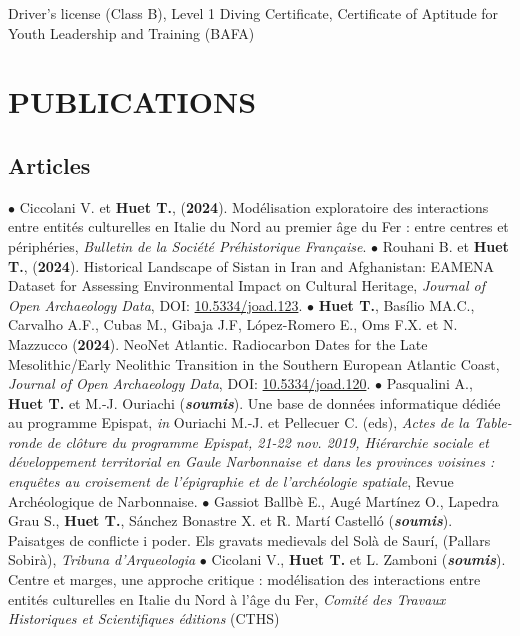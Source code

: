 \documentclass{article}
\newcommand{\fr}[1]{} %
\newcommand{\en}[1]{#1}   %
\begin{document}
{{Driver's license (Class B), Level 1 Diving Certificate, Certificate of Aptitude for Youth Leadership and Training (BAFA)}


\section{PUBLICATIONS}

\subsection*{\fr{Articles}\en{Articles}}
$\bullet$ Ciccolani V. et \textbf{Huet T.}, (\textbf{2024}). Modélisation exploratoire des interactions entre entités culturelles en Italie du Nord au premier âge du Fer : entre centres et périphéries, \textit{Bulletin de la Soci\'{e}t\'{e} Pr\'{e}historique Fran\c{c}aise}.
\smallbreak
$\bullet$ Rouhani B. et \textbf{Huet T.}, (\textbf{2024}). Historical Landscape of Sistan in Iran and Afghanistan: EAMENA Dataset for Assessing Environmental Impact on Cultural Heritage, \textit{Journal of Open Archaeology Data}, DOI: \href{https://openarchaeologydata.metajnl.com/articles/10.5334/joad.123}{10.5334/joad.123}.
\smallbreak
$\bullet$ \textbf{Huet T.}, Basílio MA.C., Carvalho A.F., Cubas M., Gibaja J.F, López-Romero E., Oms F.X. et N. Mazzucco (\textbf{2024}). NeoNet Atlantic. Radiocarbon Dates for the Late Mesolithic/Early Neolithic Transition in the Southern European Atlantic Coast, \textit{Journal of Open Archaeology Data}, DOI: \href{https://openarchaeologydata.metajnl.com/articles/10.5334/joad.120}{10.5334/joad.120}.
\smallbreak
$\bullet$ Pasqualini A., \textbf{Huet T.} et M.-J. Ouriachi (\textit{\textbf{soumis}}). Une base de données informatique dédiée au programme Epispat, \textit{in} Ouriachi M.-J. et Pellecuer C. (eds), \textit{Actes de la Table-ronde de cl\^{o}ture du programme Epispat, 21-22 nov. 2019, Hi\'{e}rarchie sociale et d\'{e}veloppement territorial en Gaule Narbonnaise et dans les provinces voisines : enqu\^{e}tes au croisement de l'\'{e}pigraphie et de l'arch\'{e}ologie spatiale}, Revue Arch\'{e}ologique de Narbonnaise.
\smallbreak
$\bullet$ Gassiot Ballbè E., Augé Martínez O., Lapedra Grau S., \textbf{Huet T.}, Sánchez Bonastre X. et R. Martí Castelló (\textit{\textbf{soumis}}). Paisatges de conflicte i poder. Els gravats medievals del Solà de Saurí, (Pallars Sobirà), \textit{Tribuna d'Arqueologia}
\smallbreak
$\bullet$ Cicolani V., \textbf{Huet T.} et L. Zamboni (\textit{\textbf{soumis}}). Centre et marges, une approche critique : modélisation des interactions entre entités culturelles en Italie du Nord à l'âge du Fer, \textit{Comit\'{e} des Travaux Historiques et Scientifiques \'{e}ditions} (CTHS)
}
\end{document}
